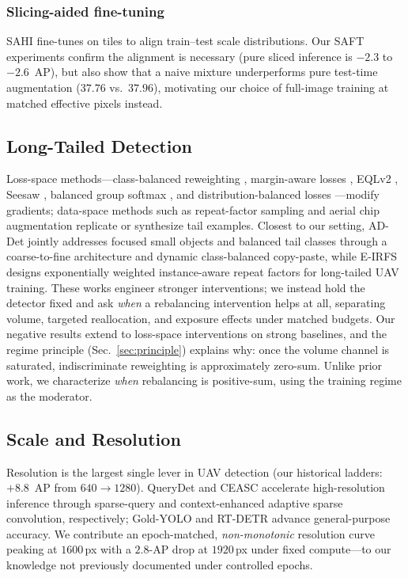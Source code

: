 \documentclass[journal]{IEEEtran}
\newcommand{\ap}{\ensuremath{\mathrm{AP}}}
\begin{document}
\subsubsection{Slicing-aided fine-tuning}
SAHI \cite{sahi} fine-tunes on tiles to align train--test scale distributions. Our SAFT experiments confirm the alignment is necessary (pure sliced inference is $-2.3$ to $-2.6$~\ap), but also show that a naive mixture underperforms pure test-time augmentation ($37.76$ vs.\ $37.96$), motivating our choice of full-image training at matched effective pixels instead.

\subsection{Long-Tailed Detection}
Loss-space methods---class-balanced reweighting \cite{cbloss}, margin-aware losses \cite{ldam}, EQLv2 \cite{eqlv2}, Seesaw \cite{seesaw}, balanced group softmax \cite{bge}, and distribution-balanced losses \cite{dbloss}---modify gradients; data-space methods such as repeat-factor sampling \cite{rfs} and aerial chip augmentation \cite{amrnet} replicate or synthesize tail examples. Closest to our setting, AD-Det \cite{addet} jointly addresses focused small objects and balanced tail classes through a coarse-to-fine architecture and dynamic class-balanced copy-paste, while E-IRFS \cite{eirfs} designs exponentially weighted instance-aware repeat factors for long-tailed UAV training. These works engineer stronger interventions; we instead hold the detector fixed and ask \emph{when} a rebalancing intervention helps at all, separating volume, targeted reallocation, and exposure effects under matched budgets. Our negative results extend to loss-space interventions on strong baselines, and the regime principle (Sec.~\ref{sec:principle}) explains why: once the volume channel is saturated, indiscriminate reweighting is approximately zero-sum. Unlike prior work, we characterize \emph{when} rebalancing is positive-sum, using the training regime as the moderator.

\subsection{Scale and Resolution}
Resolution is the largest single lever in UAV detection (our historical ladders: $+8.8$~\ap{} from $640{\to}1280$). QueryDet \cite{querydet} and CEASC \cite{ceasc} accelerate high-resolution inference through sparse-query and context-enhanced adaptive sparse convolution, respectively; Gold-YOLO \cite{goldyolo} and RT-DETR \cite{rtdetr} advance general-purpose accuracy. We contribute an epoch-matched, \emph{non-monotonic} resolution curve peaking at $1600$\,px with a $2.8$-\ap{} drop at $1920$\,px under fixed compute---to our knowledge not previously documented under controlled epochs.
\end{document}
